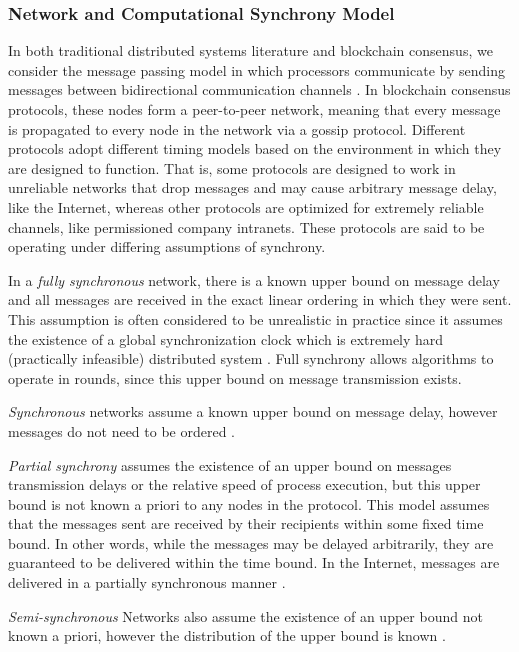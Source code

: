 \documentclass[10pt,journal,compsoc]{IEEEtran}
\begin{document}
\subsubsection{Network and Computational Synchrony Model}
In both traditional distributed systems literature and blockchain consensus, we consider the message passing model in which processors communicate by sending messages between bidirectional communication channels \cite{AttiyaWelch}. In blockchain consensus protocols, these nodes form a peer-to-peer network, meaning that every message is propagated to every node in the network via a gossip protocol. Different protocols adopt different timing models based on the environment in which they are designed to function. That is, some protocols are designed to work in unreliable networks that drop messages and may cause arbitrary message delay, like the Internet, whereas other protocols are optimized for extremely reliable channels, like permissioned company intranets. These protocols are said to be operating under differing assumptions of synchrony.  


In a \emph{fully synchronous} network, there is a known upper bound on message delay and all messages are received in the exact linear ordering in which they were sent. This assumption is often considered to be unrealistic in practice since it assumes the existence of a global synchronization clock which is extremely hard (practically infeasible) distributed system \cite{Mahnush}. Full synchrony allows algorithms to operate in rounds, since this upper bound on message transmission exists. 

\emph{Synchronous} networks assume a known upper bound on message delay, however messages do not need to be ordered \cite{Mahnush}.

\emph{Partial synchrony} assumes the existence of an upper bound on messages transmission delays or the relative speed of process execution, but this upper bound is not known a priori to any nodes in the protocol. This model assumes that the messages sent are received by their recipients within some fixed time bound. In other words, while the messages may be delayed arbitrarily, they are guaranteed to be delivered within the time bound. In the Internet, messages are delivered in a partially synchronous manner \cite{Mahnush}.

\emph{Semi-synchronous} Networks also assume the existence of an upper bound not known a priori, however the distribution of the upper bound is known \cite{Attiya&Lynch}.
\end{document}
